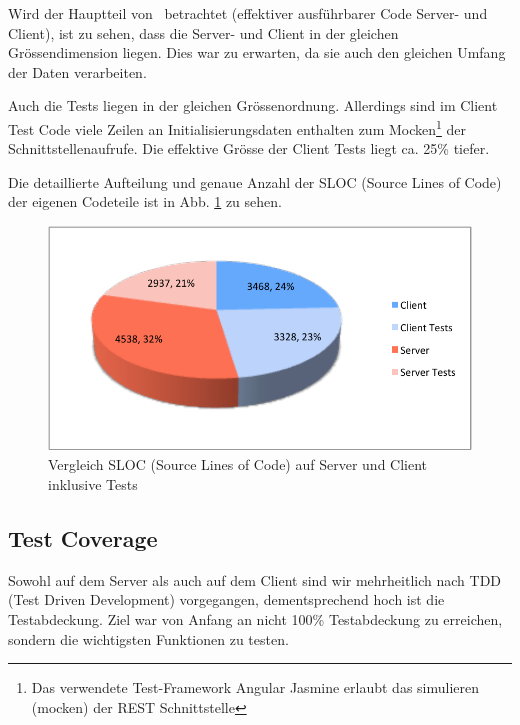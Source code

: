 	Wird der Hauptteil von \eeppi\ betrachtet (effektiver ausführbarer Code Server- und Client),
	ist zu sehen, dass die Server- und Client in der gleichen Grössendimension liegen.
	Dies war zu erwarten, da sie auch den gleichen Umfang der Daten verarbeiten.
	
	Auch die Tests liegen in der gleichen Grössenordnung.
	Allerdings sind im Client Test Code viele Zeilen an Initialisierungsdaten enthalten zum Mocken\footnote{Das verwendete Test-Framework Angular Jasmine erlaubt das simulieren (mocken) der REST Schnittstelle} der Schnittstellenaufrufe. 
	Die effektive Grösse der Client Tests liegt ca. 25\% tiefer.
	
	Die detaillierte Aufteilung und genaue Anzahl der SLOC (Source Lines of Code) der eigenen Codeteile ist in Abb. \ref{fig:serverClientSLOC} zu sehen.
	
	\begin{figure}[H]
		\includegraphics[width=\largeThird\textwidth]{projectPlan/media/img/serverClientSLOC.pdf}
		\centering
		\caption{Vergleich SLOC (Source Lines of Code) auf Server und Client inklusive Tests}
		\label{fig:serverClientSLOC}
	\end{figure}


	\subsection{Test Coverage}
	Sowohl auf dem Server als auch auf dem Client sind wir mehrheitlich nach TDD (Test Driven Development) vorgegangen,
	dementsprechend hoch ist die Testabdeckung.
	Ziel war von Anfang an nicht 100\% Testabdeckung zu erreichen, sondern die wichtigsten Funktionen zu testen.
	
